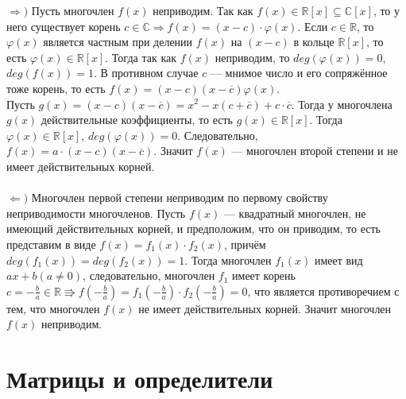 \begin{Proof}
	$\Rightarrow)$ Пусть многочлен $f(x)$ неприводим. Так как $f(x) \in \mathbb{R}[x] \subseteq  \mathbb{C}[x]$, то у него существует корень $c \in \mathbb{C} \Rightarrow f(x) = (x - c) \cdot \varphi(x)$. 
	Если $c \in \mathbb{R}$, то $\varphi(x)$ является частным при делении $f(x)$ на $(x - c)$ в кольце $\mathbb{R}[x]$, то есть $\varphi(x) \in \mathbb{R}[x]$. Тогда так как 
	$f(x)$ неприводим, то $deg(\varphi(x)) = 0$, $deg(f(x)) = 1$.
	В противном случае $c$ --- мнимое число и его сопряжённое тоже корень, то есть $f(x) = (x - c)(x-\overline{c})\varphi(x)$. \\
	Пусть $g(x) = (x - c)(x -\overline{c}) = x^2
	- x(c + \overline{c}) + c \cdot \overline{c}$. Тогда у многочлена $g(x)$ действительные коэффициенты, то есть $g(x) \in \mathbb{R}[x]$. Тогда $\varphi(x) \in \mathbb{R}[x]$, $deg(\varphi(x)) = 0$. Следовательно,  $f(x) = a \cdot (x - c)(x - \overline{c})$. Значит $f(x)$ --- многочлен второй степени и не имеет 
	действительных корней.\\\\ 
	$\Leftarrow)$ Многочлен первой степени неприводим по первому свойству неприводимости многочленов. 
	Пусть $f(x)$ --- квадратный многочлен, не имеющий действительных корней, и предположим, что он 
	приводим, то есть представим в виде $f(x) = f_1(x) \cdot f_2(x)$, причём $deg(f_1(x)) = deg(f_2(x)) = 1$. Тогда многочлен $f_1(x)$ имеет вид $ax + b (a \ne 0)$, следовательно, многочлен $f_1$ имеет корень $c = - \frac{b}{a} \in \mathbb{R} \Rrightarrow f(- \frac{b}{a})=f_1(- \frac{b}{a}) \cdot f_2(- \frac{b}{a})=0$, что является противоречием с тем, что 
	многочлен $f(x)$ не имеет действительных корней. Значит многочлен $f(x)$ неприводим. 
\end{Proof}



\chapter{Матрицы и определители}

